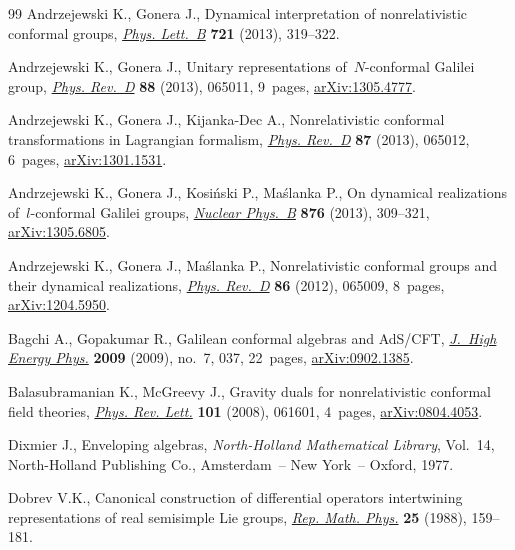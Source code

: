 \documentclass[pdftex]{sigma}
\numberwithin{equation}{section}
\begin{document}
\begin{thebibliography}{99}
Andrzejewski K., Gonera J., Dynamical interpretation of nonrelativistic conformal groups,
\href{http://dx.doi.org/10.1016/j.physletb.2013.03.020}{\textit{Phys. Lett.~B}} \textbf{721} (2013), 319--322.

Andrzejewski K., Gonera J., Unitary representations of~$N$-conformal Galilei group,
\href{http://dx.doi.org/10.1103/PhysRevD.88.065011}{\textit{Phys. Rev.~D}} \textbf{88} (2013), 065011, 9~pages, \href{http://arxiv.org/abs/1305.4777}{arXiv:1305.4777}.

Andrzejewski K., Gonera J., Kijanka-Dec A., Nonrelativistic conformal transformations in Lagrangian formalism,
\href{http://dx.doi.org/10.1103/PhysRevD.87.065012}{\textit{Phys. Rev.~D}} \textbf{87} (2013), 065012, 6~pages, \href{http://arxiv.org/abs/1301.1531}{arXiv:1301.1531}.

Andrzejewski K., Gonera J., Kosi\'nski P., Ma\'slanka P., On dynamical realizations of~$l$-conformal Galilei groups,
\href{http://dx.doi.org/10.1016/j.nuclphysb.2013.07.026}{\textit{Nuclear Phys.~B}} \textbf{876} (2013), 309--321,
\href{http://arxiv.org/abs/1305.6805}{arXiv:1305.6805}.

Andrzejewski K., Gonera J., Ma\'slanka P., Nonrelativistic conformal groups and their dynamical realizations,
\href{http://dx.doi.org/10.1103/PhysRevD.86.065009}{\textit{Phys. Rev.~D}} \textbf{86} (2012), 065009, 8~pages, \href{http://arxiv.org/abs/1204.5950}{arXiv:1204.5950}.

Bagchi A., Gopakumar R., Galilean conformal algebras and {A}d{S}/{CFT},
\href{http://dx.doi.org/10.1088/1126-6708/2009/07/037}{\textit{J.~High Energy Phys.}} \textbf{2009} (2009), no.~7, 037,
22~pages, \href{http://arxiv.org/abs/0902.1385}{arXiv:0902.1385}.

Balasubramanian K., McGreevy J., Gravity duals for nonrelativistic conformal f\/ield theories,
\href{http://dx.doi.org/10.1103/PhysRevLett.101.061601}{\textit{Phys. Rev. Lett.}} \textbf{101} (2008), 061601, 4~pages, \href{http://arxiv.org/abs/0804.4053}{arXiv:0804.4053}.

Dixmier J., Enveloping algebras, \textit{North-Holland Mathematical Library}, Vol.~14, North-Holland Publishing Co.,
Amsterdam~-- New York~-- Oxford, 1977.

Dobrev V.K., Canonical construction of dif\/ferential operators intertwining representations of real semisimple Lie
groups, \href{http://dx.doi.org/10.1016/0034-4877(88)90050-X}{\textit{Rep. Math. Phys.}} \textbf{25} (1988), 159--181.


\end{thebibliography}
\end{document}
